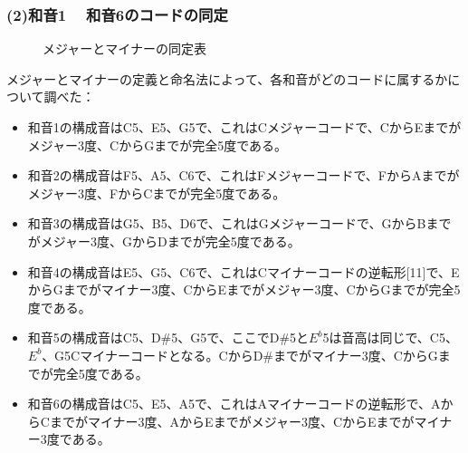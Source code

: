 \documentclass{article}
\begin{document}
\begin{spacing}{1.2}
    \subsubsection*{(2)和音1 ~ 和音6のコードの同定}
    \begin{figure}[ht] %
        \centering
        \caption{メジャーとマイナーの同定表}
    \end{figure}
    \FloatBarrier
    メジャーとマイナーの定義と命名法によって、各和音がどのコードに属するかについて調べた：
    \begin{itemize}[label={--}]
        \item 和音1の構成音はC5、E5、G5で、これはCメジャーコードで、CからEまでがメジャー3度、CからGまでが完全5度である。
        \item 和音2の構成音はF5、A5、C6で、これはFメジャーコードで、FからAまでがメジャー3度、FからCまでが完全5度である。
        \item 和音3の構成音はG5、B5、D6で、これはGメジャーコードで、GからBまでがメジャー3度、GからDまでが完全5度である。
        \item 和音4の構成音はE5、G5、C6で、これはCマイナーコードの逆転形[11]で、EからGまでがマイナー3度、CからEまでがメジャー3度、CからGまでが完全5度である。
        \item 和音5の構成音はC5、D\#5、G5で、ここでD\#5と$E^{b}$5は音高は同じで、C5、$E^{b}$、G5Cマイナーコードとなる。CからD\#までがマイナー3度、CからGまでが完全5度である。
        \item 和音6の構成音はC5、E5、A5で、これはAマイナーコードの逆転形で、AからCまでがマイナー3度、AからEまでがメジャー3度、CからEまでがマイナー3度である。
    \end{itemize}
\end{spacing}
\end{document}

